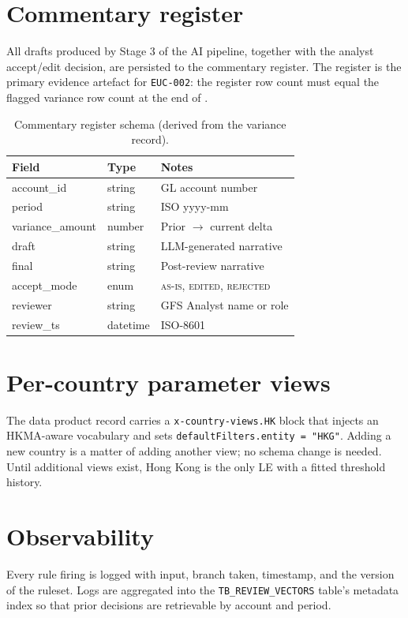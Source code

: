 \section{Commentary register}

All drafts produced by Stage 3 of the AI pipeline, together with the
analyst accept/edit decision, are persisted to the commentary
register. The register is the primary evidence artefact for
\texttt{EUC-002}: the register row count must equal the flagged
variance row count at the end of .

\begin{table}[htbp]
\caption{Commentary register schema (derived from the variance
record).}\label{tab:commentary-register}
\centering
\small
\begin{tabularx}{\linewidth}{@{}llX@{}}
\toprule
\textbf{Field} & \textbf{Type} & \textbf{Notes} \\ \midrule
account\_id      & string  & GL account number \\
period           & string  & ISO yyyy-mm \\
variance\_amount & number  & Prior $\to$ current delta \\
draft            & string  & LLM-generated narrative \\
final            & string  & Post-review narrative \\
accept\_mode     & enum    & \textsc{as-is}, \textsc{edited}, \textsc{rejected} \\
reviewer         & string  & GFS Analyst name or role \\
review\_ts       & datetime & ISO-8601 \\
\bottomrule
\end{tabularx}
\end{table}

\section{Per-country parameter views}

The data product record carries a \texttt{x-country-views.HK} block
that injects an HKMA-aware vocabulary and sets
\texttt{defaultFilters.entity = "HKG"}. Adding a new country is a
matter of adding another view; no schema change is needed. Until
additional views exist, Hong Kong is the only LE with a fitted
threshold history.

\section{Observability}

Every rule firing is logged with input, branch taken, timestamp, and
the version of the ruleset. Logs are aggregated into the
\texttt{TB\_REVIEW\_VECTORS} table's metadata index so that prior
decisions are retrievable by account and period.
